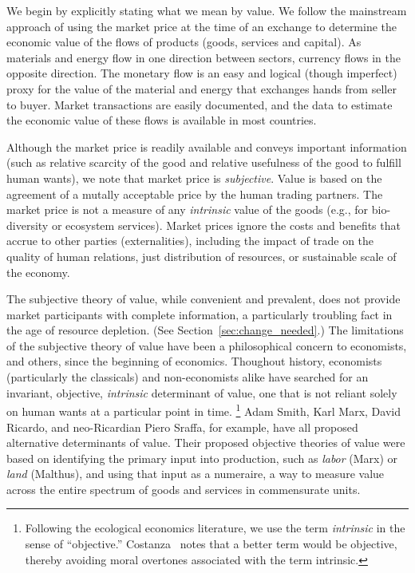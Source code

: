 
We begin by explicitly stating what we mean by value. 
We follow the mainstream approach 
of using the market price at the time of an exchange
to determine the economic value of the flows of products (goods, services and capital). 
As materials and energy flow in one direction between sectors, 
currency flows in the opposite direction. 
The monetary flow is an easy and logical (though imperfect)
proxy for the value of the material and energy that exchanges hands from seller to buyer. 
Market transactions are easily documented, 
and the data 
to estimate the economic value of these flows 
is available in most countries.\cite{IIOA-Data}

Although the market price is readily available and conveys important information (such as
relative scarcity of the good and relative usefulness of the good to fulfill human wants), we note that market
price is \emph{subjective}.  
Value is based on the agreement of a mutally acceptable price 
by the human trading partners. 
The market price
is not a measure of any \emph{intrinsic}
value of the goods (e.g., for bio-diversity or ecosystem services). 
Market prices ignore the costs and benefits that accrue 
to other parties (externalities), 
including the impact of trade on the quality of human relations, 
just distribution of resources, 
or sustainable scale of the economy.\cite[p.~55]{Daly1997} 

The subjective theory of value,
while convenient and prevalent, does not
provide market participants with complete information, 
a particularly troubling fact in the age of resource depletion. 
(See Section~\ref{sec:change_needed}.)
The limitations of the subjective theory of value
have been a philosophical concern to 
economists, and others, since the beginning of economics.
Thoughout history, economists (particularly the classicals) 
and non-economists alike have searched for an invariant, objective, 
\emph{intrinsic} determinant of value, one that is not reliant 
solely on human wants at a particular point in time.%
	\footnote{
	Following the ecological economics literature, 
	we use the term \emph{intrinsic} in the sense of ``objective.'' 
	Costanza~\cite{Costanza:2004we} 
	notes that a better term would be objective, thereby avoiding
	moral overtones associated with the term intrinsic.
	} 
Adam Smith, Karl Marx, David Ricardo, and neo-Ricardian Piero Sraffa,
for example, have all proposed 
alternative determinants of value.  
Their proposed objective theories of value were based 
on identifying the primary input into production,
such as \emph{labor} (Marx) or \emph{land} (Malthus), 
and using that input as a numeraire, 
a way to measure value across the entire spectrum 
of goods and services in commensurate units.

